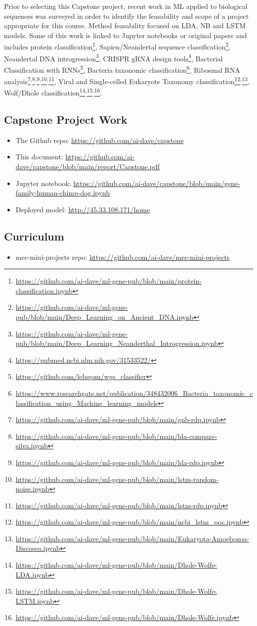 Prior to selecting this Capstone project, recent work in ML applied to biological sequences was surveyed in order to identify the feasability and scope of a project appropriate for this course.  Method feasability focused on LDA, NB and LSTM models. Some of this work is linked to Jupyter notebooks or original papers and includes protein classification\footnote{\url{https://github.com/ai-dave/ml-gene-pub/blob/main/protein-classification.ipynb}},
Sapien/Neandertal sequence classification\footnote{\url{https://github.com/ai-dave/ml-gene-pub/blob/main/Deep_Learning_on_Ancient_DNA.ipynb}},
Neandertal DNA introgression\footnote{\url{https://github.com/ai-dave/ml-gene-pub/blob/main/Deep_Learning_Neanderthal_Introgression.ipynb}}, 
CRISPR gRNA design tools\footnote{\url{https://pubmed.ncbi.nlm.nih.gov/31533522/}},
Bacterial Classification with RNNs\footnote{\url{https://github.com/lelugom/wgs_classifier}}, 
Bacteria taxonomic classification\footnote{\url{https://www.researchgate.net/publication/348432006_Bacteria_taxonomic_classification_using_Machine_learning_models}},
Ribosmal RNA analysis\footnote{\url{https://github.com/ai-dave/ml-gene-pub/blob/main/gnb-rdp.ipynb}}\textsuperscript{,}\footnote{\url{https://github.com/ai-dave/ml-gene-pub/blob/main/lda-compare-silva.ipynb}}\textsuperscript{,}\footnote{\url{https://github.com/ai-dave/ml-gene-pub/blob/main/lda-rdp.ipynb}}\textsuperscript{,}\footnote{\url{https://github.com/ai-dave/ml-gene-pub/blob/main/lstm-random-noise.ipynb}}\textsuperscript{,}\footnote{\url{https://github.com/ai-dave/ml-gene-pub/blob/main/lstm-rdp.ipynb}},
Viral and Single-celled Eukaryote Taxonomy classification\footnote{\url{https://github.com/ai-dave/ml-gene-pub/blob/main/ncbi_lstm_poc.ipynb}}\textsuperscript{,}\footnote{\url{https://github.com/ai-dave/ml-gene-pub/blob/main/Eukaryota-Amoebozoa-Discosea.ipynb}},
Wolf/Dhole classification\footnote{\url{https://github.com/ai-dave/ml-gene-pub/blob/main/Dhole-Wolfe-LDA.ipynb}}\textsuperscript{,}\footnote{\url{https://github.com/ai-dave/ml-gene-pub/blob/main/Dhole-Wolfe-LSTM.ipynb}}\textsuperscript{,}\footnote{\url{https://github.com/ai-dave/ml-gene-pub/blob/main/Dhole-Wolfe.ipynb}}.

\subsection{Capstone Project Work}

\begin{itemize}
  \item The Github repo: \url{https://github.com/ai-dave/capstone} 
  \item This document: 
  \url{https://github.com/ai-dave/capstone/blob/main/report/Capstone.pdf}
  \item Jupyter notebook: 
  \url{https://github.com/ai-dave/capstone/blob/main/gene-family-human-chimp-dog.ipynb}
  \item Deployed model: \url{http://45.33.108.171/home}
\end{itemize}

\subsection{Curriculum}

\begin{itemize}
  \item mec-mini-projects repo: \url{https://github.com/ai-dave/mec-mini-projects} 
\end{itemize}